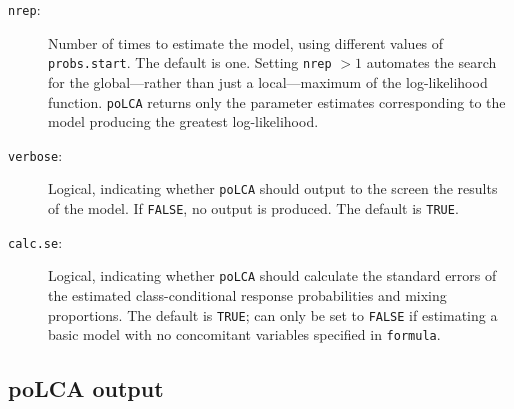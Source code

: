 \documentclass[letterpaper,12pt]{article}
\begin{document}
\begin{description}
    \item [\texttt{nrep}:] Number of times to estimate the model, using different values of \texttt{probs.start}.  The default is one.  Setting \texttt{nrep} $>1$ automates the search for the global---rather than just a local---maximum of the log-likelihood function. \texttt{poLCA} returns only the parameter estimates corresponding to the model producing the greatest log-likelihood.
    \item [\texttt{verbose}:] Logical, indicating whether \texttt{poLCA} should output to the screen the results of the model.  If \texttt{FALSE}, no output is produced. The default is \texttt{TRUE}.
    \item [\texttt{calc.se}:] Logical, indicating whether \texttt{poLCA} should calculate the standard errors of the estimated class-conditional response probabilities and mixing proportions.  The default is \texttt{TRUE}; can only be set to \texttt{FALSE} if estimating a basic model with no concomitant variables specified in \texttt{formula}.
\end{description}

\subsection{\textbf{poLCA} output}
\end{document}
